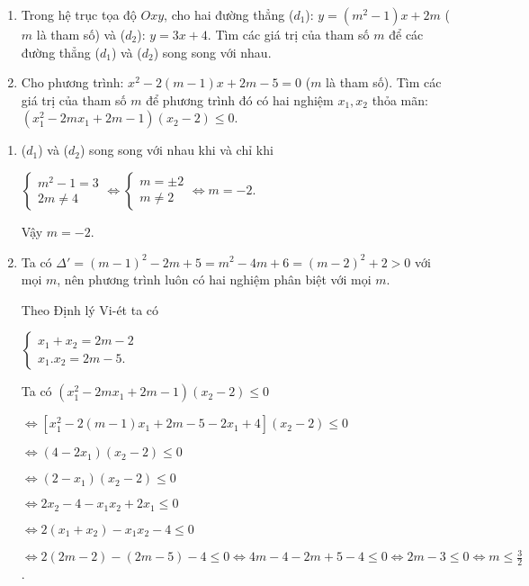 \begin{ex}%
\hfill
    \begin{enumerate}    
        \item Trong hệ trục tọa độ $Oxy$, cho hai đường thẳng ($d_1$): $y=(m^2-1)x+2m$ ($m$ là tham số) và ($d_2$): $y=3x+4$. Tìm các giá trị của tham số $m$ để các đường thẳng ($d_1$) và ($d_2$) song song với nhau.
        \item Cho phương trình: $x^2-2(m-1)x+2m-5=0$ ($m$ là tham số). Tìm các giá trị của tham số $m$ để phương trình đó có hai nghiệm $x_1,x_2$ thỏa mãn: $(x_1^2-2mx_1+2m-1)(x_2-2) \le 0$.
    \end{enumerate}
\loigiai
    {
    \begin{enumerate}
    \item ($d_1$) và ($d_2$) song song với nhau khi và chỉ khi
    
    $\begin{cases}
    m^2-1=3 \\ 2m \ne 4
    \end{cases} \Leftrightarrow \begin{cases}
    m= \pm 2 \\ m \ne 2
    \end{cases} \Leftrightarrow m =-2$.
    
    Vậy $m=-2$.
    
    \item Ta có $\Delta'=(m-1)^2-2m+5=m^2-4m+6=(m-2)^2+2 > 0$ với mọi $m$, nên phương trình luôn có hai nghiệm phân biệt với mọi $m$.
    
    Theo Định lý Vi-ét ta có
    
    $\begin{cases}
    x_1+x_2=2m-2 \\ x_1.x_2=2m-5.
    \end{cases}$
		
	Ta có $\left(x_1^2-2mx_1+2m-1\right) \left(x_2-2\right) \le 0$
	
	$\Leftrightarrow \left[x_1^2-2(m-1)x_1+2m-5-2x_1+4\right] (x_2-2) \le 0$
	
	$\Leftrightarrow (4-2x_1)(x_2-2) \le 0$
	
	$\Leftrightarrow (2-x_1)(x_2-2) \le 0$
	
	$\Leftrightarrow 2x_2-4-x_1x_2+2x_1 \le 0$
	
	$\Leftrightarrow 2(x_1+x_2)-x_1x_2-4 \le 0$
	
	$\Leftrightarrow 2(2m-2)-(2m-5)-4 \le 0 \Leftrightarrow 4m-4-2m+5-4 \le 0 \Leftrightarrow 2m-3 \le 0 \Leftrightarrow m \le \displaystyle \frac{3}{2}$.
	\end{enumerate}
    }
\end{ex}

